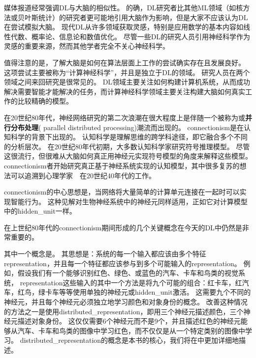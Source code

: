 媒体报道经常强调\gls{DL}与大脑的相似性。
的确，\gls{DL}研究者比其他\gls{ML}领域（如核方法或贝叶斯统计）的研究者更可能地引用大脑作为影响，但是大家不应该认为\gls{DL}在尝试模拟大脑。
现代\gls{DL}从许多领域获取灵感，特别是应用数学的基本内容如线性代数、概率论、信息论和数值优化。
尽管一些\gls{DL}的研究人员引用神经科学作为灵感的重要来源，然而其他学者完全不关心神经科学。


值得注意的是，了解大脑是如何在算法层面上工作的尝试确实存在且发展良好。
这项尝试主要被称为``计算神经科学''，并且是独立于\gls{DL}的领域。
研究人员在两个领域之间来回研究是很常见的。
\gls{DL}领域主要关注如何构建计算机系统，从而成功解决需要智能才能解决的任务，而计算神经科学领域主要关注构建大脑如何真实工作的比较精确的模型。

在20世纪80年代，神经网络研究的第二次浪潮在很大程度上是伴随一个被称为或\textbf{并行分布处理}( parallel distributed processing)潮流而出现的\citep{Rumelhart86,mcclelland1995appeal}。
\gls{connectionism}是在认知科学的背景下出现的。
认知科学是理解思维的跨学科途径，即它融合多个不同的分析层次。
在20世纪80年代初期，大多数认知科学家研究符号推理模型。
尽管这很流行，但很难从大脑如何真正用神经元实现符号模型的角度来解释这些模型。 
\gls{connectionism}者开始研究真正基于神经系统实现的认知模型\citep{Touretzky1985}，其中很多复苏的想法可以追溯到心理学家~~在20世纪40年代的工作\citep{Hebb49}。

\gls{connectionism}的中心思想是，当网络将大量简单的计算单元连接在一起时可以实现智能行为。
这种见解对生物神经系统中的神经元同样适用，正如它对计算模型中的\gls{hidden_unit}一样。

在上世纪80年代的\gls{connectionism}期间形成的几个关键概念在今天的\gls{DL}中仍然是非常重要的。

其中一个概念是\citep{Hinton-et-al-PDP1986}。
其思想是：系统的每一个输入都应该由多个特征\gls{representation}，并且每一个特征都应该参与到多个可能输入的\gls{representation}。
例如，假设我们有一个能够识别红色、绿色、或蓝色的汽车、卡车和鸟类的视觉系统，
\gls{representation}这些输入的其中一个方法是将九个可能的组合：红卡车，红汽车，红鸟，绿卡车等等使用单独的神经元或\gls{hidden_unit}激活。
这需要九个不同的神经元，并且每个神经元必须独立地学习颜色和对象身份的概念。
改善这种情况的方法之一是使用\gls{distributed_representation}，即用三个神经元描述颜色，三个神经元描述对象身份。 
这仅仅需要6个神经元而不是9个，并且描述红色的神经元能够从汽车、卡车和鸟类的图像中学习红色，而不仅仅是从一个特定类别的图像中学习。 
\gls{distributed_representation}的概念是本书的核心，我们将在中更加详细地描述。

